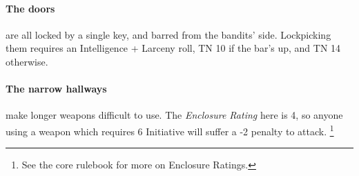 \begin{multicols}{2}
\paragraph{The doors} are all locked by a single key, and barred from the bandits' side.
Lockpicking them requires an Intelligence + Larceny roll, TN 10 if the bar's up, and TN 14 otherwise.

\paragraph{The narrow hallways}
make longer weapons difficult to use.
The \textit{Enclosure Rating} here is 4, so anyone using a weapon which requires 6 Initiative will suffer a -2 penalty to attack.%
\footnote{See the core rulebook for more on Enclosure Ratings.}

\end{multicols}

\label{sewer_map}

